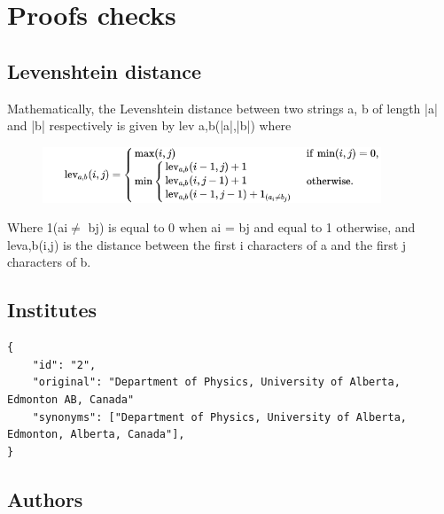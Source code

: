 \section{Proofs checks}%
\label{app:proofs}

\subsection{Levenshtein distance}%
\label{app:proofs:levenshtein}

Mathematically, the Levenshtein distance between two strings a, b of length |a| and |b| respectively is given by lev a,b(|a|,|b|) where

\begin{figure}[htb]
  \centering
  \includegraphics[width=0.9\textwidth]{figures/levenshtein.png}
  \label{fig:levenshtein}
\end{figure}

Where 1(ai$\neq$ bj) is equal to 0 when ai = bj and equal to 1 otherwise, and leva,b(i,j) is the distance between the first i characters of a and the first j characters of b.


\subsection{Institutes}%
\label{app:proofs:institute}

\begin{lstlisting}
{
    "id": "2", 
    "original": "Department of Physics, University of Alberta, Edmonton AB, Canada"
    "synonyms": ["Department of Physics, University of Alberta, Edmonton, Alberta, Canada"],
}
\end{lstlisting}


\subsection{Authors}%
\label{app:proofs:author}

